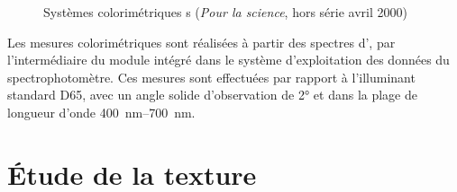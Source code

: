 \begin{figure}[htb]
  \begin{minipage}[b]{0.40\textwidth}%
    \centerfloat
  \end{minipage}%
  \hfill%
  \begin{minipage}[b]{0.45\textwidth}%
    \centerfloat
  \end{minipage}%
  \caption[Systèmes colorimétriques \trichro s]
          {Systèmes colorimétriques \trichro s (\emph{Pour la science}, hors série avril 2000)}
  \label{fig:colorimetrie}
\end{figure}

Les mesures colorimétriques sont réalisées à partir des spectres d'\AO, par l'intermédiaire du module  intégré dans le système d'exploitation des données du spectrophotomètre. Ces mesures sont effectuées par rapport à l'illuminant standard D65, avec un angle solide d'observation de \ang{2} et dans la plage de longueur d'onde \SIrange{400}{700}{\nm}.

\section{Étude de la texture}

